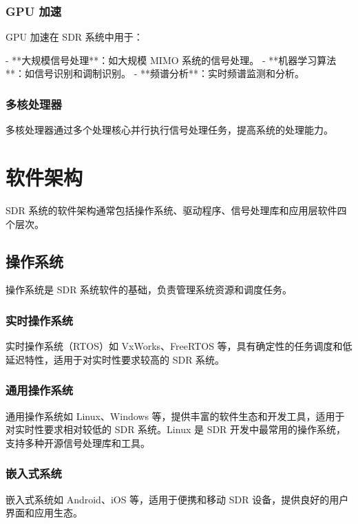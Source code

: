 \documentclass[UTF8]{ctexbook}
\begin{document}
\subsubsection{GPU 加速}

GPU 加速在 SDR 系统中用于：

- **大规模信号处理**：如大规模 MIMO 系统的信号处理。
- **机器学习算法**：如信号识别和调制识别。
- **频谱分析**：实时频谱监测和分析。

\subsubsection{多核处理器}

多核处理器通过多个处理核心并行执行信号处理任务，提高系统的处理能力。

\section{软件架构}

SDR 系统的软件架构通常包括操作系统、驱动程序、信号处理库和应用层软件四个层次。

\subsection{操作系统}

操作系统是 SDR 系统软件的基础，负责管理系统资源和调度任务。

\subsubsection{实时操作系统}

实时操作系统（RTOS）如 VxWorks、FreeRTOS 等，具有确定性的任务调度和低延迟特性，适用于对实时性要求较高的 SDR 系统。

\subsubsection{通用操作系统}

通用操作系统如 Linux、Windows 等，提供丰富的软件生态和开发工具，适用于对实时性要求相对较低的 SDR 系统。Linux 是 SDR 开发中最常用的操作系统，支持多种开源信号处理库和工具。

\subsubsection{嵌入式系统}

嵌入式系统如 Android、iOS 等，适用于便携和移动 SDR 设备，提供良好的用户界面和应用生态。
\end{document}
